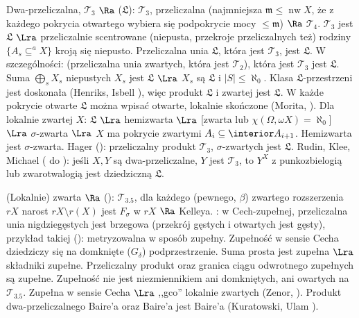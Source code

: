 Dwa-przeliczalna,  $\mathcal T_3$ $\Ra$  ($\mathfrak L$): $\mathcal T_3$, przeliczalna  (najmniejsza $\mathfrak m \le \operatorname{nw} X$, że z każdego pokrycia otwartego wybiera się podpokrycie mocy $\le \mathfrak m$) $\Ra$ $\mathcal T_4$.
$\mathcal T_3$ jest $\mathfrak L$ $\Lra$ przeliczalnie scentrowane (niepusta, przekroje przeliczalnych też) rodziny $\{A_s \subseteq^a X\}$ kroją się niepusto.
Przeliczalna unia $\mathfrak L$, która jest $\mathcal T_3$, jest $\mathfrak L$.
W szczególności:  (przeliczalna unia zwartych, która jest $\mathcal T_2$), która jest $\mathcal T_3$ jest $\mathfrak L$.
Suma $\bigoplus_s X_s$ niepustych $X_s$ jest $\mathfrak L$ $\Lra$ $X_s$ są $\mathfrak L$ i $|S| \le \aleph_0$.
Klasa $\mathfrak L$-przestrzeni jest doskonała (Henriks, Isbell ), więc produkt $\mathfrak L$ i zwartej jest $\mathfrak L$.
W każde pokrycie otwarte $\mathfrak L$ można wpisać otwarte, lokalnie skończone (Morita, ).
Dla lokalnie zwartej $X$: $\mathfrak L$ $\Lra$ hemizwarta $\Lra$ [zwarta lub $\chi(\Omega, \omega X) = \aleph_0$] $\Lra$ $\sigma$-zwarta $\Lra$ $X$ ma pokrycie zwartymi $A_i \subseteq \interior A_{i+1}$.
Hemizwarta jest $\sigma$-zwarta.
Hager (): przeliczalny produkt $\mathcal T_3$, $\sigma$-zwartych jest $\mathfrak L$.
Rudin, Klee, Michael ( do ): jeśli $X, Y$ są dwa-przeliczalne, $Y$ jest $\mathcal T_3$, to $Y^X$ z punkozbielogią lub zwarotwalogią jest dziedziczną $\mathfrak L$.

(Lokalnie)  zwarta $\Ra$  (): $\mathcal T_{3.5}$, dla każdego (pewnego, $\beta$) zwartego rozszerzenia $rX$ narost $rX \setminus r(X)$ jest $F_\sigma$ w $rX$ $\Ra$ Kelleya.
: w Cech-zupełnej, przeliczalna unia nigdziegęstych jest brzegowa (przekrój gęstych i otwartych jest gęsty), przykład takiej (): metryzowalna w sposób zupełny. 
Zupełność w sensie Cecha dziedziczy się na domknięte ($G_\delta$) podprzestrzenie.
Suma prosta jest zupełna $\Lra$ składniki zupełne.
Przeliczalny produkt oraz granica ciągu odwrotnego zupełnych są zupełne.
Zupełność nie jest niezmiennikiem ani domkniętych, ani owartych na $\mathcal T_{3.5}$.
Zupełna w sensie Cecha $\Lra$ ,,gco'' lokalnie zwartych (Zenor, ).
Produkt dwa-przeliczalnego Baire'a oraz Baire'a jest Baire'a (Kuratowski, Ulam ).

